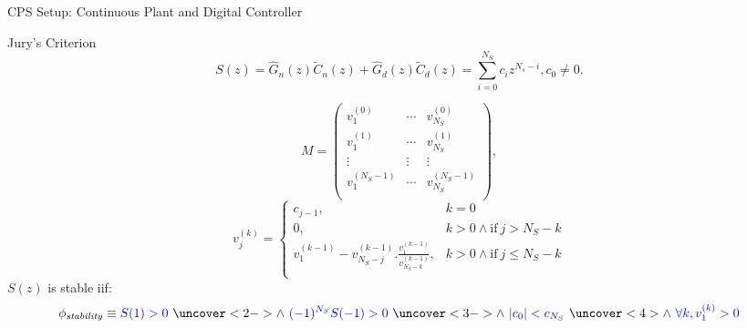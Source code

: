 \documentclass{beamer}
\begin{document}
\begin{frame}[fragile]{CPS Setup: Continuous Plant and Digital Controller}




\end{frame}

\begin{frame}{Jury's Criterion}
\begin{equation*}
S(z) = \hat{G}_n(z) \tilde{C}_n(z)+\hat{G}_d(z) \tilde{C}_d(z) = \sum_{i=0}^{N_S} c_iz^{N_s-i}, c_0\neq0. 
\end{equation*}

$$
M=\left( 
\begin{array}{ccc}
v^{(0)}_{1} &\cdots & v^{(0)}_{N_S}\\
v^{(1)}_{1} &\cdots&  v^{(1)}_{N_S}\\
\vdots&\vdots&\vdots\\
v^{(N_S-1)}_{1} &\cdots&  v^{(N_S-1)}_{N_S}\\
\end{array}
\right), $$
%
$$
v_{j}^{(k)}=\left\{
\begin{array}{ll}
c_{j-1}, & k=0\\
0,&k>0 \wedge \mbox{if}~j>N_S-k\\
v_{1}^{(k-1)}-v_{N_S-j}^{(k-1)} . \frac{v_{1}^{(k-1)}}{v_{N_S-k}^{(k-1)}}, &k>0 \wedge  \mbox{if}~j\leq N_S-k\\
\end{array}
\right.
$$
%
$S(z)$ is stable iif:
$$\phi_\mathit{stability} \equiv \textcolor{blue}{S(1) > 0}\ \uncover<2->{\wedge\ \textcolor{blue}{(-1)^{N_S} S(-1) > 0}}\ \uncover<3->{\wedge\ \textcolor{blue}{|c_0| < c_{N_S}}}\ \uncover<4>{\wedge\ \textcolor{blue}{\forall k, v_1^{(k)} > 0}}$$
\end{frame}
\end{document}
